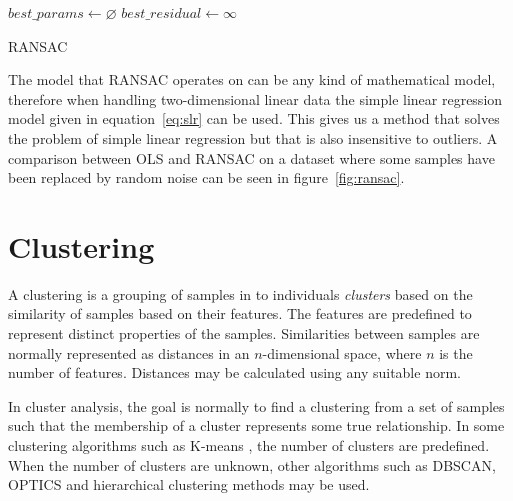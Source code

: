 \documentclass[a4paper]{report}
\begin{document}
{
    \fontsize{10}{12}
    \selectfont
    \begin{algorithm}[H]
        \DontPrintSemicolon
        \BlankLine
        \BlankLine
        $best\_params \gets \varnothing$\;
        $best\_residual \gets \infty$\;
        \BlankLine
        \caption{RANSAC}
        \label{alg:ransac}
    \end{algorithm}
}

The model that RANSAC operates on can be any kind of mathematical model, 
therefore when handling two-dimensional linear data the simple linear
regression model given in equation~\ref{eq:slr} can be used. This gives us a
method that solves the problem of simple linear regression but that is also
insensitive to outliers. A comparison between OLS and RANSAC on a dataset where
some samples have been replaced by random noise can be seen in
figure~\ref{fig:ransac}.

\section{Clustering}
A clustering is a grouping of samples in to individuals \emph{clusters}
based on the similarity of samples based on their features. The features are
predefined to represent distinct properties of the samples. Similarities
between samples are normally represented as distances in an $n$-dimensional
space, where $n$ is the number of features. Distances may be calculated using
any suitable norm.

In cluster analysis, the goal is normally to find a clustering from a
set of samples such that the membership of a cluster represents some true
relationship. In some clustering algorithms such as K-means \citep{macqueen67},
the number of clusters are predefined. When the number of clusters are unknown,
other algorithms such as DBSCAN, OPTICS and hierarchical clustering methods may
be used.
\end{document}

